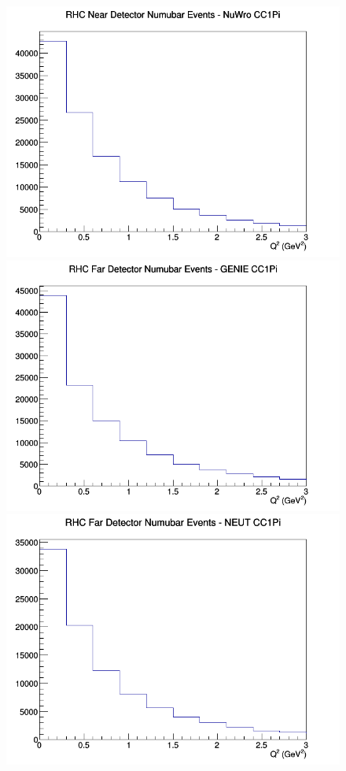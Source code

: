\begin{figure}[h]
\includegraphics[width=\linewidth]{eff_Q2/LAr/CC1Pi_RHC_ND_numubar_Q2_NuWro.png}
\endminipage
\newline
{}
\includegraphics[width=\linewidth]{eff_Q2/LAr/CC1Pi_RHC_FD_numubar_Q2_GENIE.png}
\endminipage
{}
\includegraphics[width=\linewidth]{eff_Q2/LAr/CC1Pi_RHC_FD_numubar_Q2_NEUT.png}

\end{figure}
